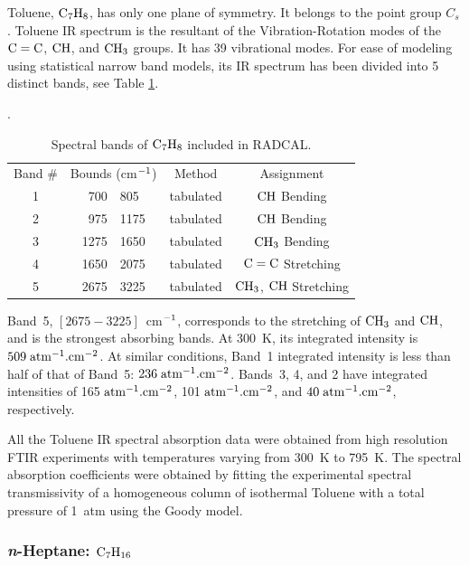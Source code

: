   Toluene, $\rm C_7H_8$, has only one plane of symmetry. 
  It belongs to the point group $C_{s}$. Toluene IR spectrum
  is the resultant of the Vibration-Rotation modes of
  the $\rm C=C$, $\rm CH$, and $\rm CH_3$ groups.
  It has 39 vibrational modes. For ease of modeling using 
  statistical narrow band models, its IR spectrum has been divided
  into 5 distinct bands, see Table \ref{Table::C7H8}.
  \begin{table}[h p] 
   \centering
   \caption{Spectral bands of $\rm C_7H_8$ included in RADCAL.}
   \vspace{0.1in}
   \label{Table::C7H8}.
   \begin{tabular}{|c|r@{-}l|c|c|} 
    \hline
    Band \# & \multicolumn{2}{|l|}{Bounds (cm$\rm ^{-1}$) } & Method & Assignment \\
    \cline{1-5}  
    1 & 700  & 805  & tabulated &  $\rm CH$ Bending \\
    2 & 975  & 1175 & tabulated &  $\rm CH$ Bending \\
    3 & 1275 & 1650 & tabulated &  $\rm CH_3$ Bending \\
    4 & 1650 & 2075 & tabulated &  $\rm C=C$ Stretching \\
    5 & 2675 & 3225 & tabulated &  $\rm CH_3$, $\rm CH$  Stretching \\
    \hline
   \end{tabular} 
  \end{table}
  Band~5, $\left[2675-3225\right]$~cm$\rm ^{-1}$, corresponds to the 
  stretching of $\rm CH_3$ and $\rm CH$, and is the strongest absorbing bands.
  At 300~K, its integrated intensity is $509\;\rm {atm^{-1}.cm^{-2}}$.
  At similar conditions, Band~1 integrated intensity is less than half
  of that of Band~5: $236\;\rm {atm^{-1}.cm^{-2}}$.
  Bands~3, 4, and 2 have integrated intensities of 165$\;\rm {atm^{-1}.cm^{-2}}$,
  101$\;\rm {atm^{-1}.cm^{-2}}$, and $40\;\rm {atm^{-1}.cm^{-2}}$, respectively.
  
  All the Toluene IR spectral absorption data were obtained from high resolution
  FTIR experiments with temperatures varying from 300~K to 795~K.
  The spectral absorption coefficients were obtained by fitting the experimental
  spectral transmissivity of a homogeneous column of isothermal Toluene
  with a total pressure of 1~atm using the Goody model. 

\subsubsection{\textit{n}-Heptane: $\rm C_7H_{16}$}

